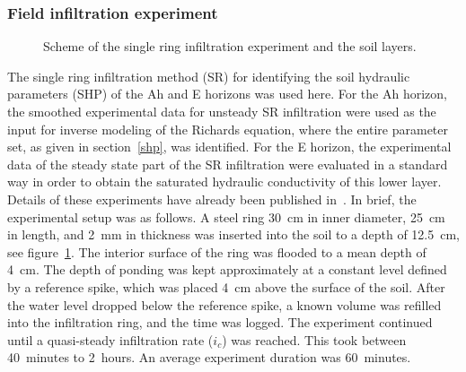 \documentclass[review]{myarticle}
\begin{document}
\subsubsection{Field infiltration experiment}%
 \begin{figure}
\centering
{}
 \caption{Scheme of the single ring infiltration experiment and the soil layers. }
 \label{experiment}
\end{figure}

The single ring infiltration method (SR) for identifying the soil hydraulic parameters (SHP) of the Ah and E horizons was used here. 
For the Ah horizon, the smoothed experimental data for unsteady SR infiltration were used as the input for inverse modeling of the Richards equation, where the entire parameter set, as given in section~\ref{shp}, was identified. For the E horizon, the experimental data of the steady state part of the SR infiltration were evaluated in a standard way in order to obtain the saturated hydraulic conductivity of this lower layer.  
Details of these experiments have already been published in~\citep{Jacka1}. In brief, the experimental setup was as follows. A steel ring 30~cm in inner diameter, 25~cm in length, and 2~mm in thickness was inserted into the soil to a depth of 12.5~cm, see figure~\ref{experiment}. The interior surface of the ring was flooded to a mean depth of 4~cm. The depth of ponding was kept approximately at a constant level defined by a reference spike, which was placed 4~cm above the surface of the soil. After the water level dropped below the reference spike, a known volume was refilled into the infiltration ring, and the time was logged. The experiment continued until a
quasi-steady infiltration rate ($i_c$) was reached. This took between 40~minutes to 2~hours. An average experiment duration was 60~minutes.
\end{document}
